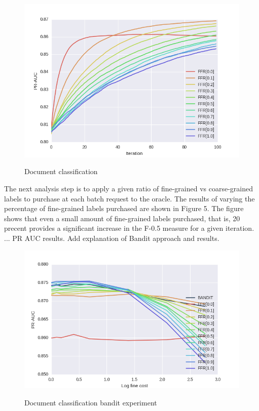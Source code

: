 \documentclass[ms]{nuthesis}
\begin{document}
\FloatBarrier
\begin{figure}[!htb]
	\centering
    \includegraphics[width=1.0\columnwidth]{fig/RCV1-16-nobandit}
    \label{fig:RCV1-16-nobandit}
    \caption{Document classification}
\end{figure}
\FloatBarrier

\par The next analysis step is to apply a given ratio of fine-grained vs coarse-grained
labels to purchase at each batch request to the oracle. The results of varying the
percentage of fine-grained labels purchased are shown in Figure 5. The figure shows
that even a small amount of fine-grained labels purchased, that is, 20 precent provides a
significant increase in the F-0.5 measure for a given iteration. ...  PR AUC results.
Add explanation of Bandit approach and results.


\FloatBarrier
\begin{figure}[!htb]
	\centering
    \includegraphics[width=1.0\columnwidth]{fig/curve-RCV1}
    \label{fig:curve-RCV1}
    \caption{Document classification bandit experiment}
\end{figure}
\FloatBarrier
\end{document}
